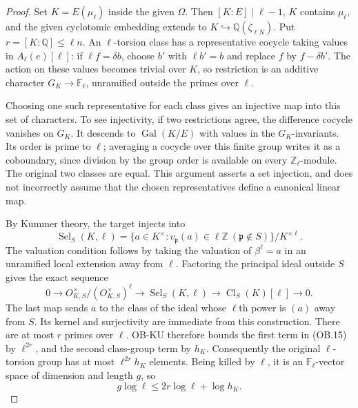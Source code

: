 \begin{proof}
Set $K=E(\mu_\ell)$ inside the given $\Omega$.  Then
$[K:E]\mid\ell-1$, $K$ contains $\mu_\ell$, and the given
cyclotomic embedding extends to
$K\hookrightarrow\mathbb Q(\zeta_{\ell N})$.
Put $r=[K:\mathbb Q]\le\ell n$.
An $\ell$-torsion class has a representative cocycle taking values
in $A_\ell(e)[\ell]$: if $\ell f=\delta b$, choose $b'$ with
$\ell b'=b$ and replace $f$ by $f-\delta b'$.
The action on these values becomes trivial over $K$, so restriction
is an additive character $G_K\to\mathbb F_\ell$, unramified
outside the primes over $\ell$.

Choosing one such representative for each class gives an injective
map into this set of characters.  To see injectivity, if two
restrictions agree, the difference cocycle vanishes on $G_K$.
It descends to $\operatorname{Gal}(K/E)$ with values in the
$G_K$-invariants.  Its order is prime to $\ell$; averaging a
cocycle over this finite group writes it as a coboundary, since
division by the group order is available on every
$\mathbb Z_\ell$-module.  The original two classes are equal.
This argument asserts a set injection, and does not incorrectly
assume that the chosen representatives define a canonical linear map.

By Kummer theory, the target injects into
\[
 \operatorname{Sel}_S(K,\ell)
 =\{a\in K^\times:v_{\mathfrak p}(a)\in\ell\mathbb Z
                  \ (\mathfrak p\notin S)\}/K^{\times\ell}.
\]
The valuation condition follows by taking the valuation of
$\beta^\ell=a$ in an unramified local extension away from $\ell$.
Factoring the principal ideal outside $S$ gives the exact sequence
\[
 0\longrightarrow O_{K,S}^\times/(O_{K,S}^\times)^\ell
 \longrightarrow\operatorname{Sel}_S(K,\ell)
 \longrightarrow\operatorname{Cl}_S(K)[\ell]
 \longrightarrow0.
 \tag{OB.15}
\]
The last map sends $a$ to the class of the ideal whose $\ell$th
power is $(a)$ away from $S$.  Its kernel and surjectivity are
immediate from this construction.  There are at most $r$ primes
over $\ell$.  OB-KU therefore bounds the first term in (OB.15)
by $\ell^{2r}$, and the second class-group term by $h_K$.
Consequently the original $\ell$-torsion group has at most
$\ell^{2r}h_K$ elements.  Being killed by $\ell$, it is an
$\mathbb F_\ell$-vector space of dimension and length $g$, so
\[
                    g\log\ell\le2r\log\ell+\log h_K.
 \tag{OB.16}
\]


\end{proof}
